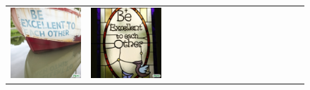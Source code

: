 \begin{figure}[ht!]
\begin{adjustwidth}{-0.8in}{-0.5in}
\begin{tabular}{cccccccccccccccccccc}
\multicolumn{3}{c}{\includegraphics[width=\twobytwocolwidth\textwidth]{figures/cherries/excellent_boat.jpg}} &
\multicolumn{3}{c}{\includegraphics[width=\twobytwocolwidth\textwidth]{figures/cherries/excellent_glass.jpg}} \\

\end{tabular}
\end{adjustwidth}
\end{figure}
